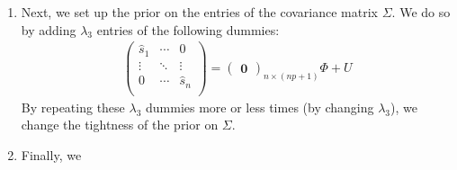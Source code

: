 \documentclass[a4paper,12pt]{scrartcl}
\begin{document}
\begin{enumerate}
    \item Next, we set up the prior on the entries of the
	covariance matrix $\Sigma$. We do so by adding
	$\lambda_3$ entries of the following dummies:
	\begin{align*}
	    \begin{pmatrix} 
		\hat{s}_1 &  \cdots & 0 \\
		\vdots & \ddots & \vdots \\
		0 & \cdots & \hat{s}_n \\
	    \end{pmatrix} = \begin{pmatrix}\mathbf{0} 
		\end{pmatrix}_{n \times (np+1)} \Phi + U
	\end{align*}
	By repeating these $\lambda_3$ dummies more or less
	times (by changing $\lambda_3$), we change the tightness
	of the prior on $\Sigma$. 

    \item Finally, we 


\end{enumerate}


\newpage








 

\end{document}
